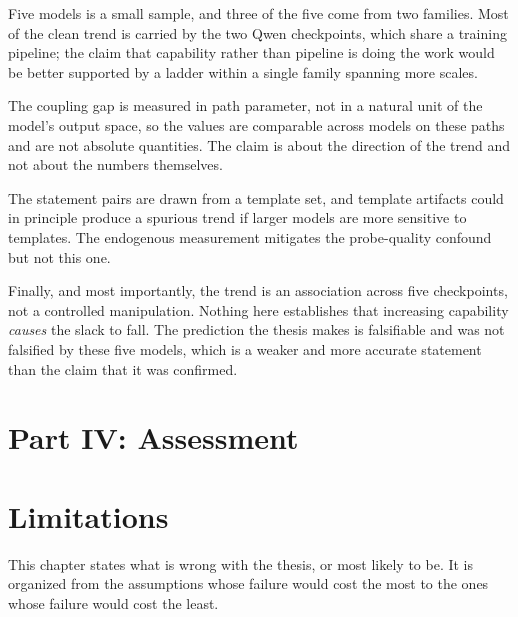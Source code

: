 \documentclass{memoir}
\begin{document}
Five models is a small sample, and three of the five come from two families.
Most of the clean trend is carried by the two Qwen checkpoints, which share a
training pipeline; the claim that capability rather than pipeline is doing the
work would be better supported by a ladder within a single family spanning more
scales.

The coupling gap is measured in path parameter, not in a natural unit of the
model's output space, so the values are comparable across models on these paths
and are not absolute quantities. The claim is about the direction of the trend
and not about the numbers themselves.

The statement pairs are drawn from a template set, and template artifacts could
in principle produce a spurious trend if larger models are more sensitive to
templates. The endogenous measurement mitigates the probe-quality confound but
not this one.

Finally, and most importantly, the trend is an association across five
checkpoints, not a controlled manipulation. Nothing here establishes that
increasing capability \emph{causes} the slack to fall. The prediction the thesis
makes is falsifiable and was not falsified by these five models, which is a
weaker and more accurate statement than the claim that it was confirmed.





\chapter{Part IV: Assessment}\label{Two--Schemas--of--Impossibility-005F-005F-005F--Machine--Checked--Limits--of--Trustworthy--Machine--Learning-005F-005F-005F--and--Why--They--Tighten--with--Capability----Part--IV-005F-005F-005F--Assessment}




\chapter{Limitations}\label{Two--Schemas--of--Impossibility-005F-005F-005F--Machine--Checked--Limits--of--Trustworthy--Machine--Learning-005F-005F-005F--and--Why--They--Tighten--with--Capability----Limitations}

This chapter states what is wrong with the thesis, or most likely to be. It is
organized from the assumptions whose failure would cost the most to the ones
whose failure would cost the least.
\end{document}
